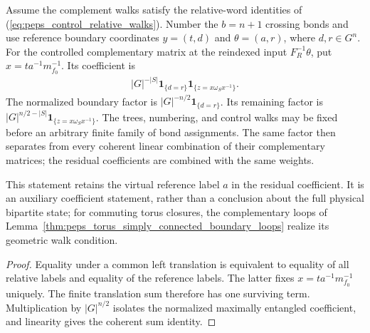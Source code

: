 \begin{lemma}%
    \label{thm:peps_controlled_complement_boundary_factor}
    \leanok
    Assume the complement walks satisfy the relative-word
    identities of (\ref{eq:peps_control_relative_walks}). Number the
    $b=n+1$ crossing bonds and use reference boundary coordinates
    $y=(t,d)$ and $\theta=(a,r)$, where $d,r\in G^n$. For the
    controlled complementary matrix at the reindexed input
    $F_R^{-1}\theta$, put $x=t a^{-1}m_{f_0}^{-1}$. Its coefficient is
    \begin{align}
        |G|^{-|S|}\mathbf 1_{\{d=r\}}
        \mathbf 1_{\{z=x\omega_Sx^{-1}\}}.
    \end{align}
    The normalized boundary factor is
    $|G|^{-n/2}\mathbf 1_{\{d=r\}}$.
    Its remaining factor is
    $|G|^{n/2-|S|}\mathbf 1_{\{z=x\omega_Sx^{-1}\}}$.
    The trees, numbering, and control walks may be fixed before an
    arbitrary finite family of bond assignments. The same factor then
    separates from every coherent linear combination of their
    complementary matrices; the residual coefficients are combined
    with the same weights.

    This statement retains the virtual reference label $a$ in the
    residual coefficient. It is an auxiliary coefficient statement,
    rather than a conclusion about the full physical bipartite state;
    for commuting torus closures, the complementary loops of
    Lemma~\ref{thm:peps_torus_simply_connected_boundary_loops} realize
    its geometric walk condition.
\end{lemma}
\begin{proof}\leanok
    Equality under a common left translation is equivalent to equality
    of all relative labels and equality of the reference labels.
    The latter fixes $x=t a^{-1}m_{f_0}^{-1}$ uniquely. The finite
    translation sum therefore has one surviving term. Multiplication
    by $|G|^{n/2}$ isolates the normalized maximally entangled
    coefficient, and linearity gives the coherent sum identity.
\end{proof}

